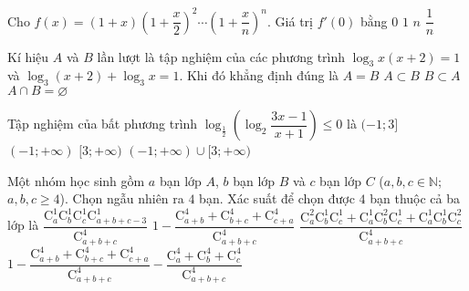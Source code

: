 \begin{ex}%
Cho $f(x) =(1+x)\left ( 1+\dfrac{x}{2}\right )^2 \cdots \left ( 1+\dfrac{x}{n}\right )^n$. Giá trị $f'(0)$ bằng 
\choice
{$0$}
{$1$}
{\True $n$}
{$\dfrac{1}{n}$}
\end{ex}

\begin{ex}%
Kí hiệu $A$ và $B$ lần lượt là tập nghiệm của các phương trình $\log_3 x(x+2)=1$ và $\log_3 (x+2)+\log_3 x=1$. Khi đó khẳng định đúng là 
\choice
{$A=B$}
{$A \subset B$}
{\True $B \subset A$}
{$A \cap B = \varnothing$}
\end{ex}

\begin{ex}%
Tập nghiệm của bất phương trình $\log_\frac{1}{2} \left ( \log_2 \dfrac{3x-1}{x+1}\right ) \leq 0$ là
\choice
{$(-1;3]$}
{$(-1;+\infty)$}
{$[3;+\infty)$}
{\True $(-1;+\infty) \cup [3;+\infty)$}
\loigiai{
$\log_\frac{1}{2} \left ( \log_2 \dfrac{3x-1}{x+1}\right ) \leq 0 \Leftrightarrow \dfrac{3x-1}{x+1} \geq 2 \Leftrightarrow \dfrac{x-3}{x+1} \geq 0 \Leftrightarrow x \in (-1;+\infty) \cup [3;+\infty)$.
}
\end{ex}

\begin{ex}%
Một nhóm học sinh gồm $a$ bạn lớp $A$, $b$ bạn lớp $B$ và $c$ bạn lớp $C$ ($a,b,c \in \mathbb{N}$; $a,b,c \geq 4$). Chọn ngẫu nhiên ra $4$ bạn. Xác suất để chọn được $4$ bạn thuộc cả ba lớp là
\choice
{$\dfrac{\mathrm{C}_a^1\mathrm{C}_b^1\mathrm{C}_c^1\mathrm{C}_{a+b+c-3}^1}{\mathrm{C}_{a+b+c}^4}$}
{$1-\dfrac{\mathrm{C}_{a+b}^4+\mathrm{C}_{b+c}^4+\mathrm{C}_{c+a}^4}{\mathrm{C}_{a+b+c}^4}$}
{\True $\dfrac{\mathrm{C}_a^2\mathrm{C}_b^1\mathrm{C}_c^1 + \mathrm{C}_a^1\mathrm{C}_b^2\mathrm{C}_c^1+\mathrm{C}_a^1\mathrm{C}_b^1\mathrm{C}_c^2}{\mathrm{C}_{a+b+c}^4}$}
{$1-\dfrac{\mathrm{C}_{a+b}^4+\mathrm{C}_{b+c}^4+\mathrm{C}_{c+a}^4}{\mathrm{C}_{a+b+c}^4}- \dfrac{\mathrm{C}_{a}^4+\mathrm{C}_{b}^4+\mathrm{C}_{c}^4}{\mathrm{C}_{a+b+c}^4}$}
\end{ex}

